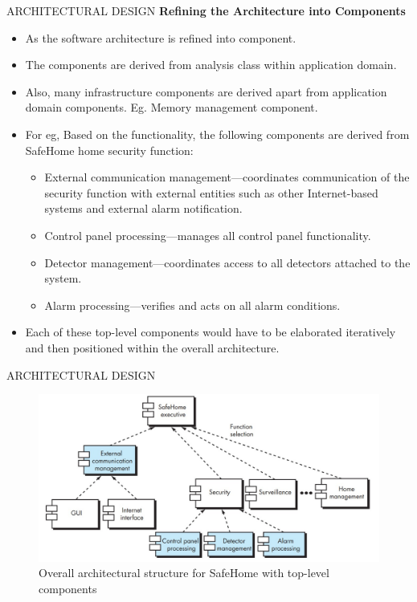 \documentclass{beamer}
\begin{document}
\begin{frame}{ARCHITECTURAL DESIGN}
	\textbf{Refining the Architecture into Components}
	\begin{itemize}
		\item As the software architecture is refined into component.
		\item The components 
		are derived from analysis class within application domain.
		\item Also, many infrastructure components are derived apart from 
		application domain components. Eg. Memory management 
		component.
		\item For eg, Based on the functionality, the following components are 
		derived from SafeHome home security function: 
		\begin{itemize}
			\item External communication management—coordinates 
			communication of the security function with external entities 
			such as other Internet-based systems and external alarm 
			notification.
		\item Control panel processing—manages all control panel functionality.
		\item  Detector management—coordinates access to all detectors attached 
			to the system.
			\item Alarm processing—verifies and acts on all alarm conditions.

		\end{itemize}
	\item Each of these top-level components would have to be elaborated 
	iteratively and then positioned within the overall architecture.
	\end{itemize}
\end{frame}
\begin{frame}{ARCHITECTURAL DESIGN}
	\begin{figure}
		\includegraphics[scale=.45]{img/m2_44.jpg}
		\caption{Overall architectural structure for SafeHome with top-level components}
	\end{figure}
\end{frame}
\end{document}
